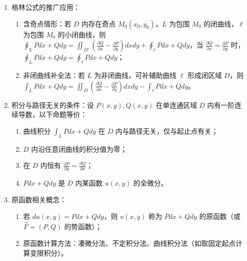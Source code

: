 \documentclass[UTF8]{ctexart}
\theoremstyle{remark}
\begin{document}
\begin{enumerate}
		\item 格林公式的推广应用：
		\begin{enumerate}
			\item 含奇点情形：若 \(D\) 内存在奇点 \(M_0(x_0, y_0)\)，\(L\) 为包围 \(M_0\) 的闭曲线，\(\ell\) 为包围 \(M_0\) 的小闭曲线，则 \(\oint_{L} Pdx + Qdy = \iint_{D'} \left(\frac{\partial Q}{\partial x} - \frac{\partial P}{\partial y}\right)dxdy + \oint_{\ell} Pdx + Qdy\)，当 \(\frac{\partial Q}{\partial x} = \frac{\partial P}{\partial y}\) 时，\(\oint_{L} Pdx + Qdy = \oint_{\ell} Pdx + Qdy\)；
			\item 非闭曲线补全法：若 \(L\) 为非闭曲线，可补辅助曲线 \(\ell\) 形成闭区域 \(D\)，则 \(\int_{L} Pdx + Qdy = \iint_{D} \left(\frac{\partial Q}{\partial x} - \frac{\partial P}{\partial y}\right)dxdy - \int_{\ell} Pdx + Qdy\)。
		\end{enumerate}
		
		\item 积分与路径无关的条件：设 \(P(x, y), Q(x, y)\) 在单连通区域 \(D\) 内有一阶连续导数，以下命题等价：
		\begin{enumerate}
			\item 曲线积分 \(\int_{L} Pdx + Qdy\) 在 \(D\) 内与路径无关，仅与起止点有关；
			\item \(D\) 内沿任意闭曲线的积分值为零；
			\item 在 \(D\) 内恒有 \(\frac{\partial P}{\partial y} = \frac{\partial Q}{\partial x}\)；
			\item \(Pdx + Qdy\) 是 \(D\) 内某函数 \(u(x, y)\) 的全微分。
		\end{enumerate}
		
		\item 原函数相关概念：
		\begin{enumerate}
			\item 若 \(du(x, y) = Pdx + Qdy\)，则 \(u(x, y)\) 称为 \(Pdx + Qdy\) 的原函数（或 \(\vec{F}=(P, Q)\) 的势函数）；
			\item 原函数计算方法：凑微分法、不定积分法、曲线积分法（如取固定起点计算变限积分）。
		\end{enumerate}
		

\end{enumerate}
\end{document}
